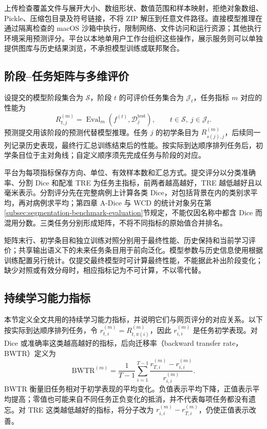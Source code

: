 上传检查覆盖文件与展开大小、数组形状、数值范围和样本映射，拒绝对象数组、Pickle、压缩包目录及符号链接，不将 ZIP 解压到任意文件路径。直接模型推理在通过隔离检查的 macOS 沙箱中执行，限制网络、文件访问和运行资源；其他执行环境采用预测评分。平台以本地单用户工作台组织这些操作，展示服务则可以单独提供图库与历史结果浏览，不承担模型训练或联邦聚合。

\subsection{阶段--任务矩阵与多维评价}
\label{subsec:medcl-evaluation}

设提交的模型阶段集合为 $\mathcal S$，阶段 $t$ 的可评价任务集合为 $\mathcal J_t$，任务指标 $m$ 对应的性能为
\begin{equation}
R^{(m)}_{t,j}=\operatorname{Eval}_m\!\left(f^{(t)},\mathcal D^{\mathrm{test}}_j\right),
\qquad t\in\mathcal S,\ j\in\mathcal J_t.
\label{eq:medcl-evaluation-matrix}
\end{equation}
预测提交用该阶段的预测代替模型推理。任务 $j$ 的初学条目为 $R^{(m)}_{s(j),j}$，后续同一列记录历史表现，最终行汇总训练结束后的性能。按实际到达顺序排列任务后，初学条目位于主对角线；自定义顺序须先完成任务与阶段的对应。

平台为每项指标保存方向、单位、有效样本数和汇总方式。提交评分以分类准确率、分割 Dice 和配准 TRE 为任务主指标，前两者越高越好，TRE 越低越好且以毫米表示。分割评分先在完整病例上计算各类 Dice，对包括背景在内的类别求平均，再对病例求平均；第四章 A-Dice 与 WCD 的统计对象另在第\ref{subsec:segmentation-benchmark-evaluation}节规定，不能仅因名称中都含 Dice 而混用分数。三类任务分别形成矩阵，不将不同指标的原始值合并排名。

矩阵末行、初学条目和独立训练对照分别用于最终性能、历史保持和当前学习评价；共享输出语义下的未来任务条目用于前向泛化。模型参数与历史信息使用根据训练配置另行统计。仅提交最终模型时可计算最终性能，不能据此补出阶段变化；缺少对照或有效分母时，相应指标记为不可计算，不以零代替。

\subsection{持续学习能力指标}
\label{sec:benchmark-metrics}

本节定义全文共用的持续学习能力指标，并说明它们与网页评分的对应关系。以下按实际到达顺序排列任务，令 $r^{(m)}_{t,i}=R^{(m)}_{t,\pi(i)}$，因此 $r^{(m)}_{i,i}$ 是任务初学表现。对 Dice 或准确率这类越高越好的指标，后向迁移率（backward transfer rate，BWTR）定义为
\begin{equation}
\mathrm{BWTR}^{(m)}
=
\frac{1}{T-1}
\sum_{i=1}^{T-1}
\frac{r^{(m)}_{T,i}-r^{(m)}_{i,i}}{r^{(m)}_{i,i}}.
\label{eq:benchmark-bwtr}
\end{equation}
BWTR 衡量旧任务相对于初学表现的平均变化。负值表示平均下降，正值表示平均提高；零值也可能来自不同任务正负变化的抵消，并不代表每项任务都没有遗忘。对 TRE 这类越低越好的指标，将分子改为 $r^{(m)}_{i,i}-r^{(m)}_{T,i}$，仍使正值表示改善。

